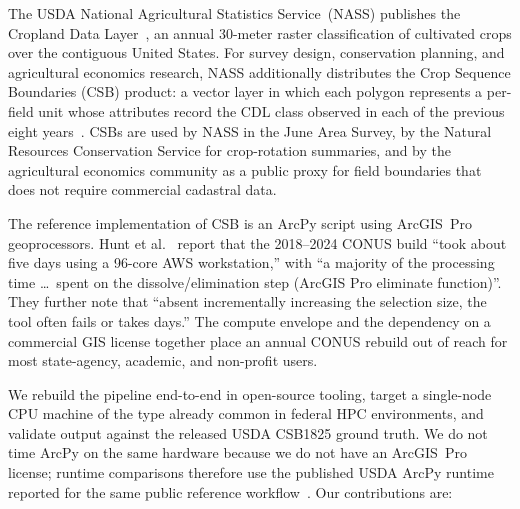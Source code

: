 \documentclass[preprint,12pt]{elsarticle}
\begin{document}
The USDA National Agricultural Statistics Service~(NASS) publishes the
Cropland Data Layer~\cite{boryan2011cdl}, an annual 30-meter raster
classification of cultivated crops over the contiguous United States.
For survey design, conservation planning, and agricultural economics
research, NASS additionally distributes the Crop Sequence Boundaries
(CSB) product: a vector layer in which each polygon represents a
per-field unit whose attributes record the CDL class observed in each
of the previous eight years~\cite{hunt2024csb,hunt2024iaos}. CSBs are
used by NASS in the June Area Survey, by the Natural Resources
Conservation Service for crop-rotation summaries, and by the
agricultural economics community as a public proxy for field
boundaries that does not require commercial cadastral data.

The reference implementation of CSB is an ArcPy script using ArcGIS~Pro
geoprocessors. Hunt et al.~\cite{hunt2024csb} report that the 2018--2024 CONUS
build ``took about five days using a 96-core AWS workstation,'' with
``a majority of the processing time \dots\ spent on the
dissolve/elimination step (ArcGIS Pro eliminate function)''. They
further note that ``absent incrementally increasing the selection size,
the tool often fails or takes days.'' The compute envelope and the
dependency on a commercial GIS license together place an annual
CONUS rebuild out of reach for most state-agency, academic, and
non-profit users.

We rebuild the pipeline end-to-end in open-source tooling, target a
single-node CPU machine of the type already common in federal HPC
environments, and validate output against the released USDA CSB1825
ground truth. We do not time ArcPy on the same hardware because we do
not have an ArcGIS~Pro license; runtime comparisons therefore use the
published USDA ArcPy runtime reported for the same public reference
workflow~\cite{hunt2024csb,usda_csb_repo}.
Our contributions are:
\end{document}
